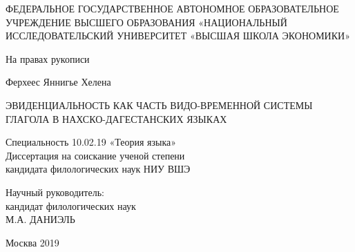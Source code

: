 
\begin{titlepage}
\begin{center}
\begin{large}
ФЕДЕРАЛЬНОЕ ГОСУДАРСТВЕННОЕ АВТОНОМНОЕ ОБРАЗОВАТЕЛЬНОЕ УЧРЕЖДЕНИЕ ВЫСШЕГО ОБРАЗОВАНИЯ «НАЦИОНАЛЬНЫЙ ИССЛЕДОВАТЕЛЬСКИЙ УНИВЕРСИТЕТ «ВЫСШАЯ ШКОЛА ЭКОНОМИКИ»
\end{large}

\begin{flushright}{На правах рукописи} \end{flushright}

\vspace{2cm}

\begin{Large}
Ферхеес Яннигье Хелена
\end{Large}

\vspace{1cm}

\begin{huge}
ЭВИДЕНЦИАЛЬНОСТЬ КАК ЧАСТЬ ВИДО-ВРЕМЕННОЙ СИСТЕМЫ ГЛАГОЛА В НАХСКО-ДАГЕСТАНСКИХ ЯЗЫКАХ
\end{huge}

\vspace{1cm}
Специальность 10.02.19 «Теория языка»\\
Диссертация на соискание ученой степени\\
кандидата филологических наук НИУ ВШЭ

\vspace{2cm}

\begin{flushright}{Научный руководитель: \\
кандидат филологических наук\\
М.А. ДАНИЭЛЬ} \end{flushright}

\vspace{1cm}

Москва 2019

\end{center}
\end{titlepage}
